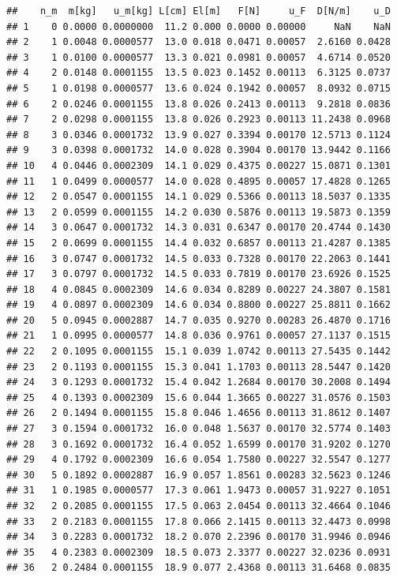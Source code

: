 \documentclass[
]{article}
\begin{document}
\begin{verbatim}
##    n_m  m[kg]   u_m[kg] L[cm] El[m]   F[N]     u_F  D[N/m]    u_D
## 1    0 0.0000 0.0000000  11.2 0.000 0.0000 0.00000     NaN    NaN
## 2    1 0.0048 0.0000577  13.0 0.018 0.0471 0.00057  2.6160 0.0428
## 3    1 0.0100 0.0000577  13.3 0.021 0.0981 0.00057  4.6714 0.0520
## 4    2 0.0148 0.0001155  13.5 0.023 0.1452 0.00113  6.3125 0.0737
## 5    1 0.0198 0.0000577  13.6 0.024 0.1942 0.00057  8.0932 0.0715
## 6    2 0.0246 0.0001155  13.8 0.026 0.2413 0.00113  9.2818 0.0836
## 7    2 0.0298 0.0001155  13.8 0.026 0.2923 0.00113 11.2438 0.0968
## 8    3 0.0346 0.0001732  13.9 0.027 0.3394 0.00170 12.5713 0.1124
## 9    3 0.0398 0.0001732  14.0 0.028 0.3904 0.00170 13.9442 0.1166
## 10   4 0.0446 0.0002309  14.1 0.029 0.4375 0.00227 15.0871 0.1301
## 11   1 0.0499 0.0000577  14.0 0.028 0.4895 0.00057 17.4828 0.1265
## 12   2 0.0547 0.0001155  14.1 0.029 0.5366 0.00113 18.5037 0.1335
## 13   2 0.0599 0.0001155  14.2 0.030 0.5876 0.00113 19.5873 0.1359
## 14   3 0.0647 0.0001732  14.3 0.031 0.6347 0.00170 20.4744 0.1430
## 15   2 0.0699 0.0001155  14.4 0.032 0.6857 0.00113 21.4287 0.1385
## 16   3 0.0747 0.0001732  14.5 0.033 0.7328 0.00170 22.2063 0.1441
## 17   3 0.0797 0.0001732  14.5 0.033 0.7819 0.00170 23.6926 0.1525
## 18   4 0.0845 0.0002309  14.6 0.034 0.8289 0.00227 24.3807 0.1581
## 19   4 0.0897 0.0002309  14.6 0.034 0.8800 0.00227 25.8811 0.1662
## 20   5 0.0945 0.0002887  14.7 0.035 0.9270 0.00283 26.4870 0.1716
## 21   1 0.0995 0.0000577  14.8 0.036 0.9761 0.00057 27.1137 0.1515
## 22   2 0.1095 0.0001155  15.1 0.039 1.0742 0.00113 27.5435 0.1442
## 23   2 0.1193 0.0001155  15.3 0.041 1.1703 0.00113 28.5447 0.1420
## 24   3 0.1293 0.0001732  15.4 0.042 1.2684 0.00170 30.2008 0.1494
## 25   4 0.1393 0.0002309  15.6 0.044 1.3665 0.00227 31.0576 0.1503
## 26   2 0.1494 0.0001155  15.8 0.046 1.4656 0.00113 31.8612 0.1407
## 27   3 0.1594 0.0001732  16.0 0.048 1.5637 0.00170 32.5774 0.1403
## 28   3 0.1692 0.0001732  16.4 0.052 1.6599 0.00170 31.9202 0.1270
## 29   4 0.1792 0.0002309  16.6 0.054 1.7580 0.00227 32.5547 0.1277
## 30   5 0.1892 0.0002887  16.9 0.057 1.8561 0.00283 32.5623 0.1246
## 31   1 0.1985 0.0000577  17.3 0.061 1.9473 0.00057 31.9227 0.1051
## 32   2 0.2085 0.0001155  17.5 0.063 2.0454 0.00113 32.4664 0.1046
## 33   2 0.2183 0.0001155  17.8 0.066 2.1415 0.00113 32.4473 0.0998
## 34   3 0.2283 0.0001732  18.2 0.070 2.2396 0.00170 31.9946 0.0946
## 35   4 0.2383 0.0002309  18.5 0.073 2.3377 0.00227 32.0236 0.0931
## 36   2 0.2484 0.0001155  18.9 0.077 2.4368 0.00113 31.6468 0.0835

\end{verbatim}
\end{document}
